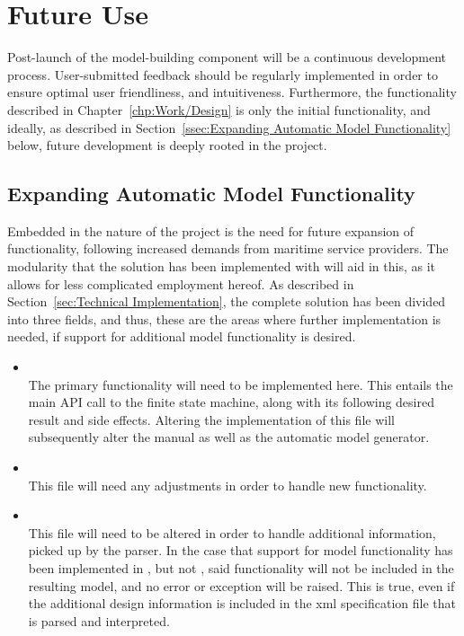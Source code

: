 \section{Future Use}
Post-launch of the model-building component will be a continuous development process. User-submitted feedback should be regularly implemented in order to ensure optimal user friendliness, and intuitiveness. Furthermore, the functionality described in Chapter~\ref{chp:Work/Design} is only the initial functionality, and ideally, as described in Section~\ref{ssec:Expanding Automatic Model Functionality} below, future development is deeply rooted in the project.

\subsection{Expanding Automatic Model Functionality}
Embedded in the nature of the project is the need for future expansion of functionality, following increased demands from maritime service providers. The modularity that the solution has been implemented with will aid in this, as it allows for less complicated employment hereof. As described in Section~\ref{sec:Technical Implementation}, the complete solution has been divided into three fields, and thus, these are the areas where further implementation is needed, if support for additional model functionality is desired.
\begin{itemize}
  \item {}\\
    The primary functionality will need to be implemented here. This entails the main API call to the finite state machine, along with its following desired result and side effects. Altering the implementation of this file will subsequently alter the manual as well as the automatic model generator.
  \item {}\\
    This file will  need any adjustments in order to handle new functionality.
  \item {}\\
    This file will need to be altered in order to handle additional information, picked up by the parser. In the case that support for model functionality has been implemented in , but not , said functionality will not be included in the resulting model, and no error or exception will be raised. This is true, even if the additional design information is included in the xml specification file that is parsed and interpreted.
\end{itemize}


